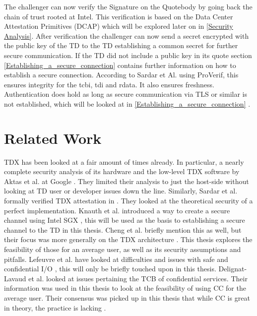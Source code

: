 The challenger can now verify the Signature on the Quotebody by going back the chain of trust rooted at Intel. This verification is based on the Data Center Attestation Primitives (DCAP) which will be explored later on in \cref{Security Analysis}. After verification the challenger can now send a secret encrypted with the public key of the TD to the TD establishing a common secret for further secure communication. If the TD did not include a public key in its quote section \cref{Establishing_a_secure_connection} contains further information on how to establish a secure connection. According to Sardar et Al. using ProVerif, this ensures integrity for the tcbi, tdi and rdata. It also ensures freshness. Authentication does hold as long as secure communication via TLS or similar is not established, which will be looked at in \cref{Establishing_a_secure_connection} \cite{sardar_formal_2023}. 

\section{Related Work}
TDX has been looked at a fair amount of times already. In particular, a nearly complete security analysis of its hardware and the low-level TDX software by Aktas et al. at Google \cite{aktas_intel_nodate}. They limited their analysis to just the host-side without looking at TD user or developer issues down the line. Similarly, Sardar et al. formally verified TDX attestation in \cite{sardar_demystifying_2021}. They looked at the theoretical security of a perfect implementation. Knauth et al. introduced a way to create a secure channel using Intel \Gls{SGX} \cite{knauth_integrating_2019}, this will be used as the basis to establishing a secure channel to the TD in this thesis. Cheng et al. briefly mention this as well, but their focus was more generally on the TDX architecture \cite{cheng_intel_2023}. This thesis explores the feasibility of those for an average user, as well as its security assumptions and pitfalls. Lefeuvre et al. have looked at difficulties and issues with safe and confidential I/O \cite{lefeuvre_towards_2023}, this will only be briefly touched upon in this thesis. Delignat-Lavaud et al. looked at issues pertaining the TCB of confidential services. Their information was used in this thesis to look at the feasibility of using CC for the average user. Their consensus was picked up in this thesis that while CC is great in theory, the practice is lacking \cite{delignat-lavaud_why_2023}. 

